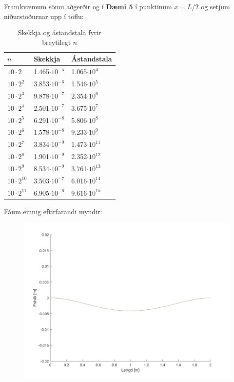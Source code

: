 \documentclass[11pt]{article}
\begin{document}
{Framkvæmum sömu aðgerðir og í \textbf{Dæmi 5} í punktinum $x=L/2$ og setjum niðurstöðurnar upp í töflu:
\begin{table}[h]
\caption{Skekkja og ástandstala fyrir breytilegt $n$}
\begin{center}
\begin{tabular}{l | l| l}
$n$ & Skekkja & Ástandstala\\
\hline
$10\cdot 2$			& 1.465$\cdot 10^{-5}$	& 1.065$\cdot 10^{4}$\\
$10\cdot 2^2$		& 3.853$\cdot 10^{-6}$	& 1.546$\cdot 10^{5}$\\
$10\cdot 2^3$		& 9.878$\cdot 10^{-7}$	& 2.354$\cdot 10^{6}$\\
$10\cdot 2^4$		& 2.501$\cdot 10^{-7}$	& 3.675$\cdot 10^{7}$\\
$10\cdot 2^5$		& 6.291$\cdot 10^{-8}$	& 5.806$\cdot 10^{8}$\\
$10\cdot 2^6$		& 1.578$\cdot 10^{-8}$	& 9.233$\cdot 10^{9}$\\
$10\cdot 2^7$		& 3.834$\cdot 10^{-9}$	& 1.473$\cdot 10^{11}$\\    
$10\cdot 2^8$		& 1.901$\cdot 10^{-9}$	& 2.352$\cdot 10^{12}$\\
$10\cdot 2^9$		& 8.534$\cdot 10^{-9}$	& 3.761$\cdot 10^{13}$\\
$10\cdot 2^{10}$	& 3.503$\cdot 10^{-7}$	& 6.016$\cdot 10^{14}$\\
$10\cdot 2^{11}$	& 6.905$\cdot 10^{-6}$	& 9.616$\cdot 10^{15}$\\
\end{tabular}
\end{center}
\end{table}
Fáum einnig eftirfarandi myndir:
\begin{figure}[H]
\centering
\includegraphics[scale=0.3]{britch.png}

\end{figure}}
\end{document}
